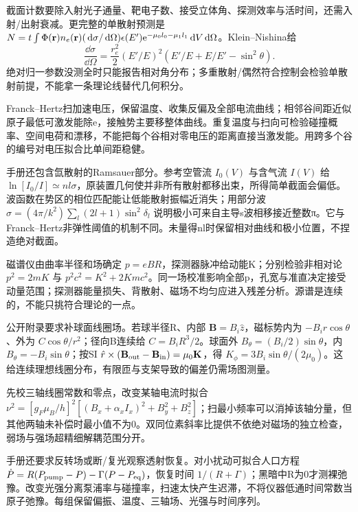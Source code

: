 截面计数要除入射光子通量、靶电子数、接受立体角、探测效率与活时间，还需入射/出射衰减。更完整的单散射预测是 $N=t\int\Phi(\mathbf r) n_e(\mathbf r)(\,\mathrm d\sigma/\,\mathrm d\Omega)\epsilon(E')\mathrm e^{-\mu_0l_0-\mu_1l_1}\,\mathrm d V\,\mathrm d\Omega$。Klein--Nishina给
\[
 \frac{\dd\sigma}{\dd\Omega}=\frac{r_e^2}{2}(E'/E)^2\left(E'/E+E/E'-\sin^2\theta\right).
\]
绝对归一参数没测全时只能报告相对角分布；多重散射/偶然符合控制会检验单散射前提，不能拿一条理论线替代几何积分。

Franck--Hertz扫加速电压，保留温度、收集反偏及全部电流曲线；相邻谷间距近似原子最低可激发能除e，接触势主要移整体曲线。重复温度与扫向可检验碰撞概率、空间电荷和漂移，不能把每个谷相对零电压的距离直接当激发能。用跨多个谷的编号对电压拟合比单间距稳健。

手册还包含氙散射的Ramsauer部分。参考空管流 $I_0(V)$ 与含气流 $I(V)$ 给 $\ln[I_0/I]\simeq nl\sigma$，原装置几何使并非所有散射都移出束，所得简单截面会偏低。波函数在势区的相位匹配能让低能散射振幅近消失；用部分波 $\sigma=(4\pi/k^2)\sum_l(2l+1)\sin^2\delta_l$ 说明极小可来自主导s波相移接近整数π。它与Franck--Hertz非弹性阈值的机制不同。未量得nl时保留相对曲线和极小位置，不捏造绝对截面。

磁谱仪由曲率半径和场确定 $p=eBR$，探测器脉冲给动能K；分别检验非相对论 $p^2=2mK$ 与 $p^2c^2=K^2+2Kmc^2$。同一场校准影响全部p，孔宽与准直决定接受动量范围；探测器能量损失、背散射、磁场不均匀应进入残差分析。源谱是连续的，不能只挑符合理论的一点。

公开附录要求补球面线圈场。若球半径R、内部 $\mathbf B=B_i\hat z$，磁标势内为 $-B_ir\cos\theta$、外为 $C\cos\theta/r^2$；径向B连续给 $C=B_iR^3/2$。球面外 $B_\theta=(B_i/2)\sin\theta$，内 $B_\theta=-B_i\sin\theta$；按SI $\hat r\times(\mathbf B_{\rm out}-\mathbf B_{\rm in})=\mu_0\mathbf K$，得 $K_\phi=3B_i\sin\theta/(2\mu_0)$。这给连续理想线圈分布，有限匝与支架导致的偏差仍需场图测量。

先校三轴线圈常数和零点，改变某轴电流时拟合 $\nu^2=[g_F\mu_B/h]^2[(B_x+\alpha_xI_x)^2+B_y^2+B_z^2]$；扫最小频率可以消掉该轴分量，但其他两轴未补偿时最小值不为0。双同位素斜率比提供不依绝对磁场的独立检查，弱场与强场超精细解耦范围分开。

手册还要求反转场或断/复光观察透射恢复。对小扰动可拟合人口方程 $\dot P=R(P_{\rm pump}-P)-\Gamma(P-P_{\rm eq})$，恢复时间 $1/(R+\Gamma)$；黑暗中R为0才测裸弛豫。改变光强分离泵浦率与碰撞率，扫速太快产生迟滞，不将仪器低通时间常数当原子弛豫。每组保留偏振、温度、三轴场、光强与时间序列。

